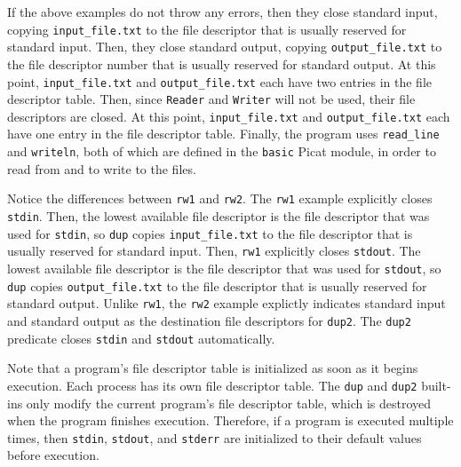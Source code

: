 {If the above examples do not throw any errors, then they close standard input, copying \texttt{input\_file.txt} to the file descriptor that is usually reserved for standard input.  Then, they close standard output, copying \texttt{output\_file.txt} to the file descriptor number that is usually reserved for standard output.  At this point, \texttt{input\_file.txt} and \texttt{output\_file.txt} each have two entries in the file descriptor table.  Then, since \texttt{Reader} and \texttt{Writer} will not be used, their file descriptors are closed.  At this point, \texttt{input\_file.txt} and \texttt{output\_file.txt} each have one entry in the file descriptor table.  Finally, the program uses \texttt{read\_line} and \texttt{writeln}, both of which are defined in the \texttt{basic} Picat module, in order to read from and to write to the files.

Notice the differences between \texttt{rw1} and \texttt{rw2}.  The \texttt{rw1} example explicitly closes \texttt{stdin}.  Then, the lowest available file descriptor is the file descriptor that was used for \texttt{stdin}, so \texttt{dup} copies \texttt{input\_file.txt} to the file descriptor that is usually reserved for standard input.  Then, \texttt{rw1} explicitly closes \texttt{stdout}.  The lowest available file descriptor is the file descriptor that was used for \texttt{stdout}, so \texttt{dup} copies \texttt{output\_file.txt} to the file descriptor that is usually reserved for standard output.  Unlike \texttt{rw1}, the \texttt{rw2} example explictly indicates standard input and standard output as the destination file descriptors for \texttt{dup2}.  The \texttt{dup2} predicate closes \texttt{stdin} and \texttt{stdout} automatically.

Note that a program's file descriptor table is initialized as soon as it begins execution.  Each process has its own file descriptor table.  The \texttt{dup} and \texttt{dup2} built-ins only modify the current program's file descriptor table, which is destroyed when the program finishes execution.  Therefore, if a program is executed multiple times, then \texttt{stdin}, \texttt{stdout}, and \texttt{stderr} are initialized to their default values before execution.  

}
